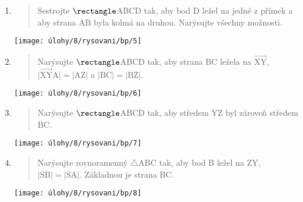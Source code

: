 \begin{enumerate}
\begin{minipage}[t]{\linewidth}
    \end{minipage}

    \item
    \begin{minipage}[t]{\linewidth}
        \begin{quote}
            Sestrojte $\rectangle$ABCD tak, aby bod D ležel na jedné z přímek a aby strana $\text{AB}$ byla kolmá na druhou.
            Narýsujte všechny možnosti.
        \end{quote}
        \centering
        \texttt{[image: úlohy/8/rysovani/bp/5]}

    \end{minipage}

    \item
    \begin{minipage}[t]{\linewidth}
        \begin{quote}
            Narýsujte $\rectangle$ABCD tak, aby strana $\text{BC}$ ležela na $\overrightarrow{\text{XY}}$, ${\lvert \overrightarrow{\text{XY}} \text{A} \rvert = \lvert \text{AZ} \rvert}$ a ${\lvert \text{BC} \rvert = \lvert \text{BZ} \rvert}$.
        \end{quote}
        \centering
        \texttt{[image: úlohy/8/rysovani/bp/6]}

    \end{minipage}

    \item
    \begin{minipage}[t]{\linewidth}
        \begin{quote}
            Narýsujte $\rectangle$ABCD tak, aby středem $\text{YZ}$ byl zároveň středem $\text{BC}$.
        \end{quote}
        \centering
        \texttt{[image: úlohy/8/rysovani/bp/7]}

    \end{minipage}

    \item
    \begin{minipage}[t]{\linewidth}
        \begin{quote}
            Narýsujte rovnoramenný $\triangle$ABC tak, aby bod B ležel na $\text{ZY}$, $\lvert \text{SB} \rvert = \lvert \text{SA} \rvert$.
            Základnou je strana BC\@.
        \end{quote}
        \centering
        \texttt{[image: úlohy/8/rysovani/bp/8]}

    \end{minipage}


\end{enumerate}

